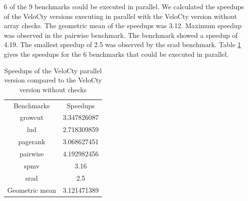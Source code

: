 6 of the 9 benchmarks could be executed in parallel. We calculated the speedups of the VeloCty versions executing in parallel with the VeloCty version without array checks. The geometric mean of the speedups was 3.12. Maximum speedup was observed in the pairwise benchmark. The benchmark showed a speedup of 4.19. The smallest speedup of 2.5  was observed by the srad benchmark. Table \ref{tab:cpvscwopy} gives the speedups for the 6 benchmarks that could be executed in parallel.
\begin{table}[h]
\centering
\begin{tabular}{|c|c|}
\hline
Benchmarks     & Speedups    \\ \hhline{|=|=|}
growcut        & 3.347826087 \\ \hline
lud            & 2.718309859 \\ \hline
pagerank       & 3.068627451 \\ \hline
pairwise       & 4.192982456 \\ \hline
spmv           & 3.16        \\ \hline
srad           & 2.5         \\ \hline
Geometric mean & 3.121471389 \\ \hline
\end{tabular}
\caption{Speedups of the VeloCty parallel version compared to the VeloCty version without checks}
\label{tab:cpvscwopy}
\end{table}
